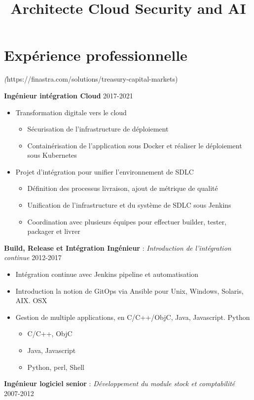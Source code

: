 \documentclass[11pt,a4paper]{moderncv}
\title{Architecte Cloud Security and AI}
\begin{document}
\makecvtitle

\section{Expérience professionnelle}


{
\textit(https://finastra.com/solutions/treasury-capital-markets)
\bigskip

\textbf{Ingénieur intégration Cloud} \hfill 2017-2021
\bigskip
	\begin{itemize}%
		\item Transformation digitale vers le cloud
			\begin{itemize}%
				\item Sécurisation de l'infrastructure de déploiement
				\item Containérisation de l'application sous Docker et réaliser le déploiement sous Kubernetes
			\end{itemize}
	\end{itemize}
\bigskip
	\begin{itemize}%
	\item	Projet d’intégration pour unifier l'environnement de SDLC
		\begin{itemize}%
				\item Définition des processus livraison, ajout de métrique de qualité
				\item Unification de l'infrastructure et du système de SDLC sous Jenkins
				\item Coordination avec plusieurs équipes pour effectuer builder, tester, packager  et livrer
		\end{itemize}
	\end{itemize}
\bigskip
 \textbf{Build, Release et Intégration Ingénieur} : \textit{Introduction de l'intégration continue} \hfill 2012-2017
\bigskip
			\begin{itemize}%
				\item Intégration continue avec Jenkins pipeline et automatisation
                \item Introduction la notion de GitOps via Ansible pour Unix, Windows, Solaris, AIX. OSX
				\item Gestion de multiple applications, en C/C++/ObjC, Java, Javascript. Python
					\begin{itemize}
						\item C/C++, ObjC
						\item Java, Javascript
						\item Python, perl, Shell
					\end{itemize}
				\end{itemize}
\bigskip
\textbf{Ingénieur logiciel senior} : \textit{Développement du module stock et comptabilité} \hfill 2007-2012

}
\end{document}
